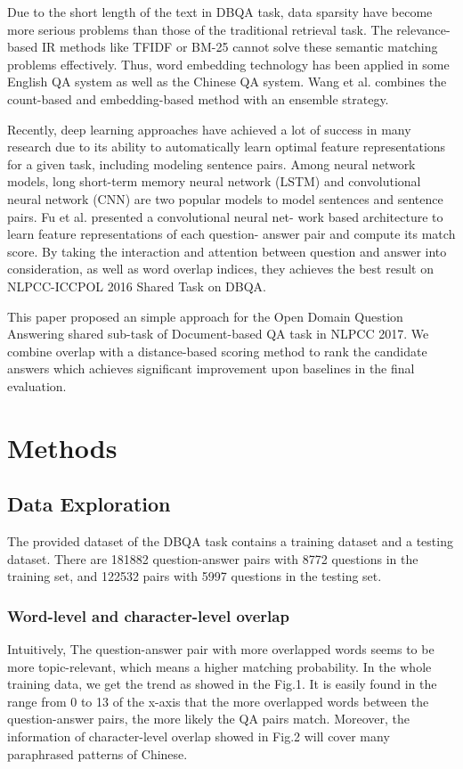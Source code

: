 \documentclass{llncs}
\begin{document}
Due to the short length of the text in DBQA task, data sparsity have become
more serious problems than those of the traditional retrieval task. The 
relevance-based IR methods like TFIDF or BM-25 cannot solve these semantic 
matching problems effectively. Thus, word embedding technology \cite{Mikolov} has been 
applied in some English QA system as well as the Chinese QA system. Wang et al.\cite{Wang} combines 
the count-based and embedding-based method with an ensemble strategy.

Recently, deep learning approaches have achieved a lot of success in many
research due to its ability to automatically learn optimal feature 
representations for a given task, including modeling sentence pairs. Among 
neural network models, long short-term memory neural network (LSTM) \cite{Hochreiter} and 
convolutional neural network (CNN) \cite{LeCun} are two popular models to model 
sentences and sentence pairs. Fu et al.\cite{Fu} presented a convolutional neural net-
work based architecture to learn feature representations of each question-
answer pair and compute its match score. By taking the interaction and
attention between question and answer into consideration, as well as word
overlap indices, they achieves the best result on NLPCC-ICCPOL
2016 Shared Task on DBQA.

This paper proposed an simple approach for the Open Domain Question Answering
shared sub-task of Document-based QA task in NLPCC 2017. We combine 
overlap with a distance-based scoring method to rank the candidate answers 
which achieves significant improvement upon baselines in the final evaluation.

\section{Methods}

\subsection{Data Exploration}
The provided dataset of the DBQA task contains a training dataset and a testing 
dataset. There are 181882 question-answer pairs with 8772 questions in the
training set, and 122532 pairs with 5997 questions in the testing set.

\subsubsection{Word-level and character-level overlap}
Intuitively, The question-answer pair with more overlapped words seems to be 
more topic-relevant, which means a higher matching probability. In the whole 
training data, we get the trend as showed in the Fig.1. It is easily found in 
the range from 0 to 13 of the x-axis that the more overlapped words between the
 question-answer pairs, the more likely the QA pairs match. Moreover, the 
information of character-level overlap showed in Fig.2 will cover many 
paraphrased patterns of Chinese.
\end{document}
